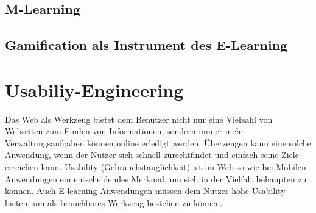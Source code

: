 \documentclass[a4paper, 12pt, twoside, BCOR=20mm, DIV=calc, abstracton, parskip=half*, toc=bibliography, toc=listof, headsepline, footsepline, headings=small, numbers=enddot]{scrreprt}
\begin{document}
	\section{M-Learning}
	
	\section{Gamification als Instrument des E-Learning}
	
	
	\chapter{Usabiliy-Engineering}
	Das Web als Werkzeug bietet dem Benutzer nicht nur eine Vielzahl von Webseiten zum Finden von Informationen, sondern immer mehr Verwaltungsaufgaben können online erledigt werden. Überzeugen kann eine solche Anwendung, wenn der Nutzer sich schnell zurechtfindet und einfach seine Ziele erreichen kann. Usability (Gebrauchstauglichkeit) ist im Web so wie bei Mobilen Anwendungen ein entscheidendes Merkmal, um sich in der Vielfalt behaupten zu können. Auch E-learning Anwendungen müssen dem Nutzer hohe Usability bieten, um als brauchbares Werkzeug bestehen zu können.\newline
	
\end{document}
